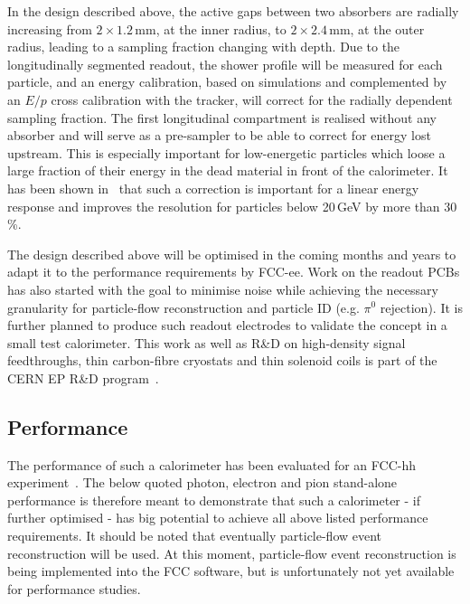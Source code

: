 In the design described above, the active gaps between two absorbers are radially increasing from $2\times1.2\,\mathrm{mm}$, at the inner radius, to $2\times2.4\,\mathrm{mm}$, at the outer radius, leading to a sampling fraction changing with depth. Due to the longitudinally segmented readout, the shower profile will be measured for each particle, and an energy calibration, based on simulations and complemented by an $E/p$ cross calibration with the tracker, will correct for the radially dependent sampling fraction. 
The first longitudinal compartment is realised without any absorber and will serve as a pre-sampler to be able to correct for energy lost upstream. This is especially important for low-energetic particles which loose a large fraction of their energy in the dead material in front of the calorimeter. It has been shown in~\cite{aleksa2019calorimeters} that such a correction is important for a linear energy response and improves the resolution for particles below 20\,GeV by more than 30\,\%.

The design described above will be optimised in the coming months and years to adapt it to the performance requirements by FCC-ee. Work on the readout PCBs has also started with the goal to minimise noise while achieving the necessary granularity for particle-flow reconstruction and particle ID (e.g. $\pi^0$ rejection). It is further planned to produce such readout electrodes to validate the concept in a small test calorimeter. This work as well as R\&D on high-density signal feedthroughs, thin carbon-fibre cryostats and thin solenoid coils is part of the CERN EP R\&D program~\cite{Aleksa:2649646}. 

\subsection{Performance}
The performance of such a calorimeter has been evaluated for an FCC-hh experiment~\cite{aleksa2019calorimeters,Aleksa:2020qdy}. The below quoted photon, electron and pion stand-alone performance is therefore meant to demonstrate that such a calorimeter - if further optimised - has big potential to achieve all above listed performance requirements. It should be noted that eventually particle-flow event reconstruction will be used. 
At this moment, particle-flow event reconstruction is being implemented into the FCC software, but is unfortunately not yet available for performance studies.

